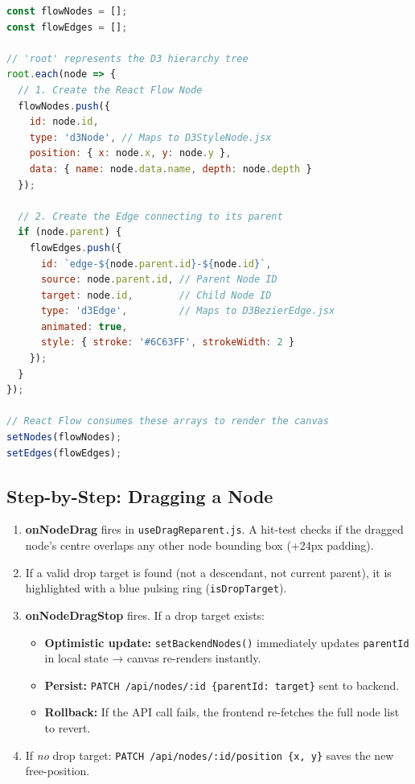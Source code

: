 \documentclass[12pt, a4paper]{article}
\begin{document}
\begin{lstlisting}[language=javascript, caption={Generating Nodes and Edges for React Flow}]
const flowNodes = [];
const flowEdges = [];

// 'root' represents the D3 hierarchy tree
root.each(node => {
  // 1. Create the React Flow Node
  flowNodes.push({
    id: node.id,
    type: 'd3Node', // Maps to D3StyleNode.jsx
    position: { x: node.x, y: node.y },
    data: { name: node.data.name, depth: node.depth }
  });

  // 2. Create the Edge connecting to its parent
  if (node.parent) {
    flowEdges.push({
      id: `edge-${node.parent.id}-${node.id}`,
      source: node.parent.id, // Parent Node ID
      target: node.id,        // Child Node ID
      type: 'd3Edge',         // Maps to D3BezierEdge.jsx
      animated: true,
      style: { stroke: '#6C63FF', strokeWidth: 2 }
    });
  }
});

// React Flow consumes these arrays to render the canvas
setNodes(flowNodes);
setEdges(flowEdges);
\end{lstlisting}

\subsection{Step-by-Step: Dragging a Node}
\begin{enumerate}[noitemsep]
  \item \textbf{onNodeDrag} fires in \texttt{useDragReparent.js}. A hit-test checks if the dragged node's centre overlaps any other node bounding box (+24px padding).
  \item If a valid drop target is found (not a descendant, not current parent), it is highlighted with a blue pulsing ring (\texttt{isDropTarget}).
  \item \textbf{onNodeDragStop} fires. If a drop target exists:
    \begin{itemize}[noitemsep]
      \item \textbf{Optimistic update:} \texttt{setBackendNodes()} immediately updates \texttt{parentId} in local state → canvas re-renders instantly.
      \item \textbf{Persist:} \texttt{PATCH /api/nodes/:id \{parentId: target\}} sent to backend.
      \item \textbf{Rollback:} If the API call fails, the frontend re-fetches the full node list to revert.
    \end{itemize}
  \item If \textit{no} drop target: \texttt{PATCH /api/nodes/:id/position \{x, y\}} saves the new free-position.
\end{enumerate}
\end{document}
